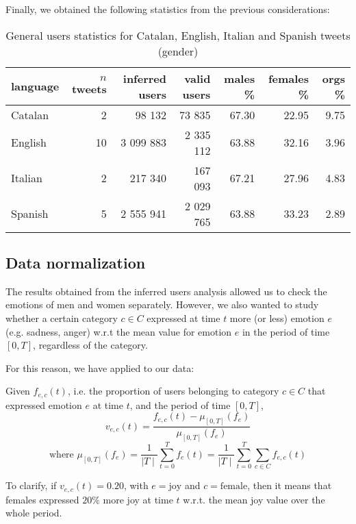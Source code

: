 Finally, we obtained the following statistics from the previous considerations:

\begin{table}[h]
	\centering
	\begin{tabular}{lrrrrrr}
		\toprule
		\textbf{language} & \textbf{\(n\) tweets} & \textbf{inferred users} & \textbf{valid users} & \textbf{males \%} & \textbf{females \%} & \textbf{orgs \%}
		\\
		\midrule
		Catalan & 2 & 98 132 & 73 835 & 67.30 & 22.95 & 9.75
		\\
		English & 10 & 3 099 883 & 2 335 112 & 63.88 & 32.16 & 3.96 
		\\
		Italian & 2 & 217 340 & 167 093 & 67.21 & 27.96 & 4.83 
		\\
		Spanish & 5 & 2 555 941 & 2 029 765 & 63.88 & 33.23 & 2.89 
		\\
		\bottomrule
	\end{tabular}
	\caption{General users statistics for Catalan, English, Italian and Spanish tweets (gender)}
	\label{tab:users-languages}
\end{table}

\subsection{Data normalization}
\label{subsec:normalization2}

The results obtained from the inferred users analysis allowed us to check the emotions of men and women separately. However, we also wanted to study whether a certain category \(c \in C\) expressed at time \(t\) more (or less) emotion \(e\) (e.g. sadness, anger) w.r.t the mean value for emotion \(e\) in the period of time \([0, T]\), regardless of the category.

For this reason, we have applied  to our data:
	
\begin{definition}
\label{def:categories-normalization}
	Given \(f_{e, c}(t)\), i.e. the proportion of users belonging to category \(c \in C\) that expressed emotion \(e\) at time \(t\), and the period of time \([0,T]\),
	\[v_{e, c}(t) = \frac{f_{e, c}(t) - \mu_{[0,T]}(f_e)}{\mu_{[0,T]}(f_e)}\]
	\[\text{where } \mu_{[0,T]}(f_e) = \frac{1}{\mid T \mid} \sum_{t =0}^{T} f_e(t) = \frac{1}{\mid T \mid} \sum_{t =0}^{T} \sum_{c \in C} f_{e, c}(t)\] 
\end{definition}

To clarify, if \(v_{e, c}(t) = 0.20\), with \(e = \text{joy}\) and \(c = \text{female}\), then it means that females expressed \(20\%\) more joy at time \(t\) w.r.t. the mean joy value over the whole period.

